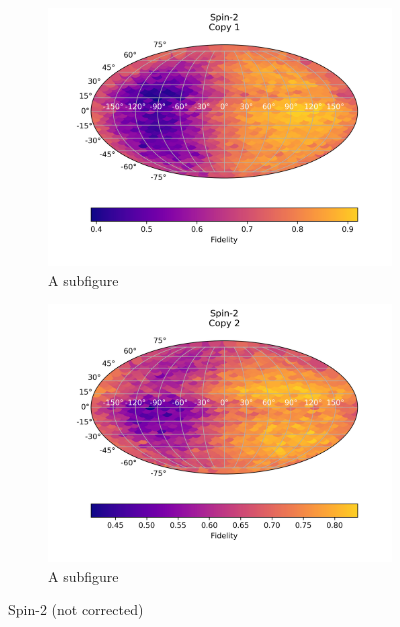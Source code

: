 \begin{figure}[H]
    \centering
    \begin{subfigure}{.5\textwidth}
      \centering
      \includegraphics[width=\textwidth]{Figures/Economical/Spin2/FullSphere/results_spin2.txt_copy1.png}
      \caption{A subfigure}
      \label{fig:ec_spin2_sphere_1}
    \end{subfigure}%
    \begin{subfigure}{.5\textwidth}
      \centering
      \includegraphics[width=\textwidth]{Figures/Economical/Spin2/FullSphere/results_spin2.txt_copy2.png}
      \caption{A subfigure}
      \label{fig:ec_spin2_sphere_2}
    \end{subfigure}
    \caption{Spin-2 (not corrected)}
    \label{fig:ec_spin2_sphere}
\end{figure}
